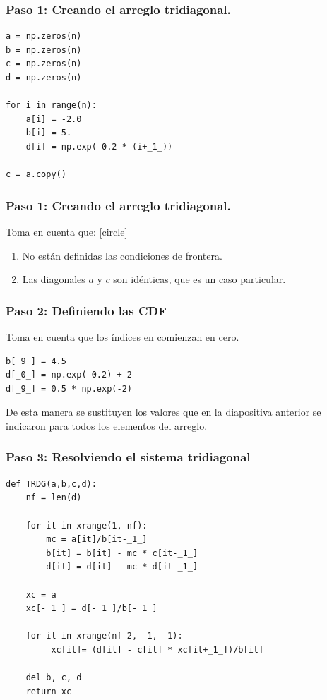 \begin{frame}[fragile]
\frametitle{Paso 1: Creando el arreglo tridiagonal.}
\begin{lstlisting}[caption=Definiendo el arreglo, style=FormattedNumber, basicstyle=\linespread{1.1}\ttfamily=\small, columns=fullflexible]
a = np.zeros(n)
b = np.zeros(n)
c = np.zeros(n)
d = np.zeros(n)

for i in range(n):
    a[i] = -2.0
    b[i] = 5.
    d[i] = np.exp(-0.2 * (i+_1_))

c = a.copy()
\end{lstlisting}
\end{frame}
\begin{frame}[fragile]
\frametitle{Paso 1: Creando el arreglo tridiagonal.}
Toma en cuenta que:
[circle]
\begin{enumerate}[<+->]
\item No están definidas las condiciones de frontera.
\item Las diagonales $a$ y $c$ son idénticas, que es un caso particular.
\end{enumerate}
\end{frame}
\begin{frame}[fragile]
\frametitle{Paso 2: Definiendo las CDF}
Toma en cuenta que los índices en \python{} comienzan en cero.
\begin{lstlisting}[caption=Estableciendo las CDF, style=FormattedNumber, basicstyle=\linespread{1.1}\ttfamily=\small, columns=fullflexible]
b[_9_] = 4.5
d[_0_] = np.exp(-0.2) + 2
d[_9_] = 0.5 * np.exp(-2)
\end{lstlisting}
\pause
De esta manera se sustituyen los valores que en la diapositiva anterior se indicaron para todos los elementos del arreglo.
\end{frame}
\begin{frame}
\frametitle{Paso 3: Resolviendo el sistema tridiagonal}
\begin{lstlisting}[caption=La función TRDG, style=FormattedNumber, basicstyle=\linespread{1.1}\ttfamily=\small, columns=fullflexible]
def TRDG(a,b,c,d):
    nf = len(d)
   
    for it in xrange(1, nf):
        mc = a[it]/b[it-_1_]
        b[it] = b[it] - mc * c[it-_1_] 
        d[it] = d[it] - mc * d[it-_1_]

    xc = a
    xc[-_1_] = d[-_1_]/b[-_1_]

    for il in xrange(nf-2, -1, -1):
         xc[il]= (d[il] - c[il] * xc[il+_1_])/b[il]
        
    del b, c, d 
    return xc
\end{lstlisting}
\end{frame}
